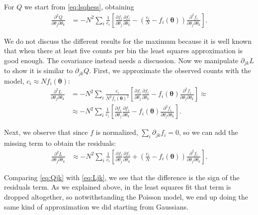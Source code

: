 For $Q$ we start from \eqref{eq:lsqhess}, obtaining
%
\begin{align}
    \frac {\partial^2 Q} {\partial\theta_j \partial\theta_k} &=
    -N^2 \sum_i
    \frac 1 {c_i} \left[
    \frac {\partial f_i} {\partial \theta_j}
    \frac {\partial f_i} {\partial \theta_k}
    - \left( \frac{c_i} N - f_i(\boldsymbol\theta) \right)
    \frac {\partial^2 f_i} {\partial\theta_j \partial\theta_k}
    \right]. \label{eq:Qjk}
\end{align}

We do not discuss the different results for the maximum because it is well
known that when there at least five counts per bin the least squares
approximation is good enough. The covariance instead needs a discussion. Now we
manipulate $\partial_{jk} L$ to show it is similar to $\partial_{jk} Q$. First,
we approximate the observed counts with the model, $c_i \approx N
f_i(\boldsymbol\theta)$:
%
\begin{align}
    \frac {\partial^2 L} {\partial\theta_j \partial\theta_k} &=
    -N^2 \sum_i \frac {c_i} {N^2 f_i(\boldsymbol\theta)^2} \left[
    \frac {\partial f_i} {\partial \theta_j}
    \frac {\partial f_i} {\partial \theta_k}
    - f_i(\boldsymbol\theta)
    \frac {\partial^2 f_i} {\partial\theta_j \partial\theta_k}
    \right] \approx \\
    &\approx
    -N^2 \sum_i \frac 1 {c_i} \left[
    \frac {\partial f_i} {\partial \theta_j}
    \frac {\partial f_i} {\partial \theta_k}
    - f_i(\boldsymbol\theta)
    \frac {\partial^2 f_i} {\partial\theta_j \partial\theta_k}
    \right].
\end{align}

Next, we observe that since $f$ is normalized, $\sum_i \partial_{jk} f_i = 0$,
so we can add the missing term to obtain the residuals:
%
\begin{align}
    \frac {\partial^2 L} {\partial\theta_j \partial\theta_k} &\approx
    -N^2 \sum_i \frac 1 {c_i} \left[
    \frac {\partial f_i} {\partial \theta_j}
    \frac {\partial f_i} {\partial \theta_k}
    + \left( \frac {c_i} N - f_i(\boldsymbol\theta) \right)
    \frac {\partial^2 f_i} {\partial\theta_j \partial\theta_k}
    \right]. \label{eq:Ljk}
\end{align}

Comparing \eqref{eq:Qjk} with \eqref{eq:Ljk}, we see that the difference is the
sign of the residuals term. As we explained above, in the least squares fit
that term is dropped altogether, so notwithstanding the Poisson model, we end
up doing the same kind of approximation we did starting from Gaussians.

